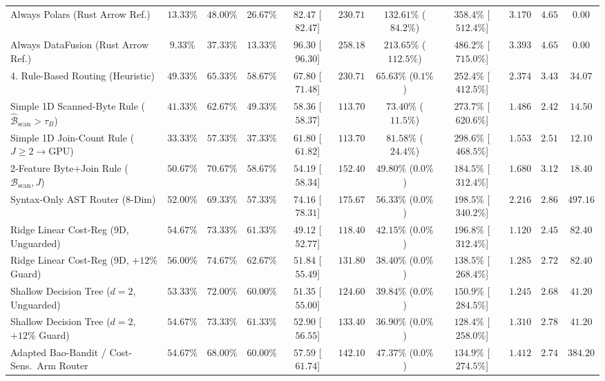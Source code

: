 \documentclass[10pt,a4paper]{article}
\newenvironment{fitasttable}{%
  \begin{lrbox}{\asttblbox}%
}{%
  \end{lrbox}%
  \sbox{\asttblboxB}{%
    \ifdim\wd\asttblbox>0.96\textwidth
      \resizebox{0.96\textwidth}{!}{\usebox{\asttblbox}}%
    \else
      \usebox{\asttblbox}%
    \fi
  }%
  \ifdim\ht\asttblboxB>0.72\textheight
    \resizebox{!}{0.72\textheight}{\usebox{\asttblboxB}}%
  \else
    \usebox{\asttblboxB}%
  \fi
}
\begin{document}
\begin{table}[!htbp]
\begin{fitasttable}
\begin{tabular}{@{}lcccccccccc@{}}
Always Polars (Rust Arrow Ref.) & $13.33\%$ & $48.00\%$ & $26.67\%$ & $82.47$ [$82.47$] & $230.71$ & $132.61\%$ ($84.2\%$) & $358.4\%$ [$512.4\%$] & $3.170$ & $4.65$ & $0.00$ \\
Always DataFusion (Rust Arrow Ref.) & $9.33\%$ & $37.33\%$ & $13.33\%$ & $96.30$ [$96.30$] & $258.18$ & $213.65\%$ ($112.5\%$) & $486.2\%$ [$715.0\%$] & $3.393$ & $4.65$ & $0.00$ \\
4. Rule-Based Routing (Heuristic) & $49.33\%$ & $65.33\%$ & $58.67\%$ & $67.80$ [$71.48$] & $230.71$ & $65.63\%$ ($0.1\%$) & $252.4\%$ [$412.5\%$] & $2.374$ & $3.43$ & $34.07$ \\
Simple 1D Scanned-Byte Rule ($\hat{\mathcal{B}}_{\text{scan}} > \tau_B$) & $41.33\%$ & $62.67\%$ & $49.33\%$ & $58.36$ [$58.37$] & $113.70$ & $73.40\%$ ($11.5\%$) & $273.7\%$ [$620.6\%$] & $1.486$ & $2.42$ & $14.50$ \\
Simple 1D Join-Count Rule ($J \ge 2 \rightarrow \text{GPU}$) & $33.33\%$ & $57.33\%$ & $37.33\%$ & $61.80$ [$61.82$] & $113.70$ & $81.58\%$ ($24.4\%$) & $298.6\%$ [$468.5\%$] & $1.553$ & $2.51$ & $12.10$ \\
2-Feature Byte+Join Rule ($\mathcal{B}_{\text{scan}}, J$) & $50.67\%$ & $70.67\%$ & $58.67\%$ & $54.19$ [$58.34$] & $152.40$ & $49.80\%$ ($0.0\%$) & $184.5\%$ [$312.4\%$] & $1.680$ & $3.12$ & $18.40$ \\
Syntax-Only AST Router (8-Dim) & $52.00\%$ & $69.33\%$ & $57.33\%$ & $74.16$ [$78.31$] & $175.67$ & $56.33\%$ ($0.0\%$) & $198.5\%$ [$340.2\%$] & $2.216$ & $2.86$ & $497.16$ \\
Ridge Linear Cost-Reg (9D, Unguarded) & $54.67\%$ & $73.33\%$ & $61.33\%$ & $49.12$ [$52.77$] & $118.40$ & $42.15\%$ ($0.0\%$) & $196.8\%$ [$312.4\%$] & $1.120$ & $2.45$ & $82.40$ \\
Ridge Linear Cost-Reg (9D, $+12\%$ Guard) & $56.00\%$ & $74.67\%$ & $62.67\%$ & $51.84$ [$55.49$] & $131.80$ & $38.40\%$ ($0.0\%$) & $138.5\%$ [$268.4\%$] & $1.285$ & $2.72$ & $82.40$ \\
Shallow Decision Tree ($d=2$, Unguarded) & $53.33\%$ & $72.00\%$ & $60.00\%$ & $51.35$ [$55.00$] & $124.60$ & $39.84\%$ ($0.0\%$) & $150.9\%$ [$284.5\%$] & $1.245$ & $2.68$ & $41.20$ \\
Shallow Decision Tree ($d=2$, $+12\%$ Guard) & $54.67\%$ & $73.33\%$ & $61.33\%$ & $52.90$ [$56.55$] & $133.40$ & $36.90\%$ ($0.0\%$) & $128.4\%$ [$258.0\%$] & $1.310$ & $2.78$ & $41.20$ \\
Adapted Bao-Bandit / Cost-Sens.\ Arm Router & $54.67\%$ & $68.00\%$ & $60.00\%$ & $57.59$ [$61.74$] & $142.10$ & $47.37\%$ ($0.0\%$) & $134.9\%$ [$274.5\%$] & $1.412$ & $2.74$ & $384.20$ \\

\end{tabular}
\end{fitasttable}
\end{table}
\end{document}
